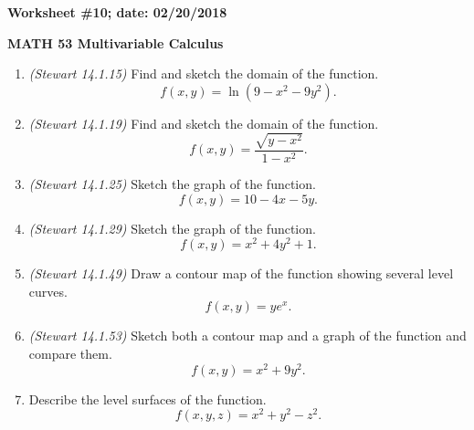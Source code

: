 \documentclass{article}
\begin{document}
{\bf Worksheet \#10; date: 02/20/2018}

{\bf MATH 53 Multivariable Calculus}

\begin{enumerate}
\item {\em (Stewart 14.1.15)} Find and sketch the domain of the function.
\[
f(x, y) = \ln(9 - x^2 - 9y^2).
\]

\item {\em (Stewart 14.1.19)} Find and sketch the domain of the function.
\[
f(x, y) = \frac{\sqrt{y - x^2}}{1 - x^2}.
\]

\item {\em (Stewart 14.1.25)} Sketch the graph of the function.
\[
f(x, y) = 10 - 4x - 5y.
\]

\item {\em (Stewart 14.1.29)} Sketch the graph of the function.
\[
f(x, y) = x^2 + 4y^2 + 1.
\]

\item {\em (Stewart 14.1.49)} Draw a contour map of the function showing several level curves.
\[
f(x, y) = y e^x.
\]

\item {\em (Stewart 14.1.53)} Sketch both a contour map and a graph of the function and compare them.
\[
f(x, y) = x^2 + 9y^2.
\]

\item Describe the level surfaces of the function.
\[
f(x, y, z) = x^2 + y^2 - z^2.
\]
\end{enumerate}
\end{document}
